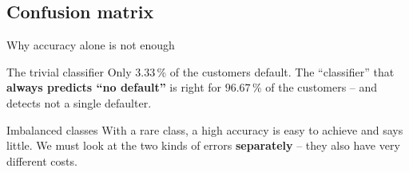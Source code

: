\documentclass[aspectratio=169,11pt]{beamer}
\begin{document}
\subsection{Confusion matrix}

\begin{frame}{Why accuracy alone is not enough}
  \begin{block}{The trivial classifier}
    Only $3.33\,\%$ of the customers default. The ``classifier'' that
    \textbf{always predicts ``no default''} is right for
    $96.67\,\%$ of the customers -- and detects not a single defaulter.
  \end{block}
  \begin{alertblock}{Imbalanced classes}
    With a rare class, a high accuracy is easy to achieve and says little.
    We must look at the two kinds of errors \textbf{separately} -- they also
    have very different costs.
  \end{alertblock}
\end{frame}
\end{document}
